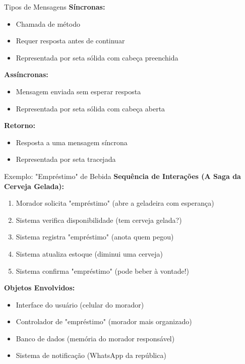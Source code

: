 \documentclass[aspectratio=169]{beamer}
\begin{document}
\begin{frame}{Tipos de Mensagens}
\textbf{Síncronas:}
\begin{itemize}
\item Chamada de método
\item Requer resposta antes de continuar
\item Representada por seta sólida com cabeça preenchida
\end{itemize}

\vspace{0.3cm}
\textbf{Assíncronas:}
\begin{itemize}
\item Mensagem enviada sem esperar resposta
\item Representada por seta sólida com cabeça aberta
\end{itemize}

\vspace{0.3cm}
\textbf{Retorno:}
\begin{itemize}
\item Resposta a uma mensagem síncrona
\item Representada por seta tracejada
\end{itemize}
\end{frame}

\begin{frame}{Exemplo: "Empréstimo" de Bebida}
\textbf{Sequência de Interações (A Saga da Cerveja Gelada):}
\begin{enumerate}
\item Morador solicita "empréstimo" (abre a geladeira com esperança)
\item Sistema verifica disponibilidade (tem cerveja gelada?)
\item Sistema registra "empréstimo" (anota quem pegou)
\item Sistema atualiza estoque (diminui uma cerveja)
\item Sistema confirma "empréstimo" (pode beber à vontade!)
\end{enumerate}

\vspace{0.5cm}
\textbf{Objetos Envolvidos:}
\begin{itemize}
\item Interface do usuário (celular do morador)
\item Controlador de "empréstimo" (morador mais organizado)
\item Banco de dados (memória do morador responsável)
\item Sistema de notificação (WhatsApp da república)
\end{itemize}
\end{frame}
\end{document}
